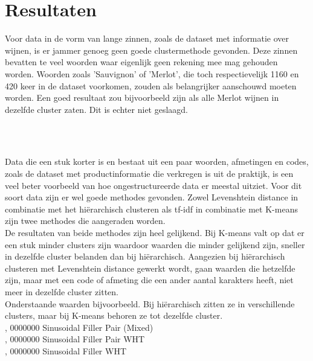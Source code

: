 \section{Resultaten}
Voor data in de vorm van lange zinnen, zoals de dataset met informatie over wijnen, is er jammer genoeg geen goede clustermethode gevonden. Deze zinnen bevatten te veel woorden waar eigenlijk geen rekening mee mag gehouden worden. Woorden zoals 'Sauvignon' of 'Merlot', die toch respectievelijk 1160 en 420 keer in de dataset voorkomen, zouden als belangrijker aanschouwd moeten worden. Een goed resultaat zou bijvoorbeeld zijn als alle Merlot wijnen in dezelfde cluster zaten. Dit is echter niet geslaagd.

\\\indent

\\\indent
Data die een stuk korter is en bestaat uit een paar woorden, afmetingen en codes, zoals de dataset met productinformatie die verkregen is uit de praktijk, is een veel beter voorbeeld van hoe ongestructureerde data er meestal uitziet. Voor dit soort data zijn er wel goede methodes gevonden. Zowel Levenshtein distance in combinatie met het hiërarchisch clusteren als tf-idf in combinatie met K-means zijn twee methodes die aangeraden worden.
\\\indent
De resultaten van beide methodes zijn heel gelijkend. Bij K-means valt op dat er een stuk minder clusters zijn waardoor waarden die minder gelijkend zijn, sneller in dezelfde cluster belanden dan bij hiërarchisch. Aangezien bij hiërarchisch clusteren met Levenshtein distance gewerkt wordt, gaan waarden die hetzelfde zijn, maar met een code of afmeting die een ander aantal karakters heeft, niet meer in dezelfde cluster zitten.
\\\indent
Onderstaande waarden bijvoorbeeld. Bij hiërarchisch zitten ze in verschillende clusters, maar bij K-means behoren ze tot dezelfde cluster.
\\ , 00\/00\/000 Sinusoidal Filler Pair (Mixed)
\\ , 00\/00\/000 Sinusoidal Filler Pair WHT
\\, 00\/00\/000 Sinusoidal Filler WHT
\\\indent



